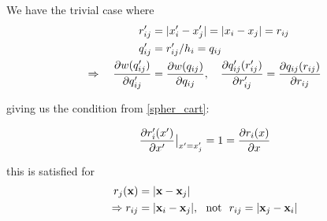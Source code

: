 We have the trivial case where
\begin{align*}
	r'_{ij} &= |x_i' - x_j'| = | x_i - x_j | = r_{ij} \\
	q'_{ij} &= r'_{ij}/h_i = q_{ij} \\
	\Rightarrow \quad \frac{\partial w(q'_{ij})}{\partial q'_{ij}} &= \frac{\partial w(q_{ij})}{\partial q_{ij}}, \quad \frac{\partial q'_{ij}(r'_{ij})}{\partial r'_{ij}} = \frac{\partial q_{ij}(r_{ij})}{\partial r_{ij}}
\end{align*}



giving us the condition from \ref{spher_cart}:






\begin{equation}
	\frac{\partial r'_{i}(x')}{\partial x'}	  \big{|}_{x' = x_j' } = 1 = \frac{\partial r_{i}(x)}{\partial x}
\end{equation}


this is satisfied for
\begin{align*}
	r_j(\mathbf{x}) &= | \mathbf{x} - \mathbf{x}_j | \\ 
	\Rightarrow r_{ij} &= | \mathbf{x}_i - \mathbf{x}_j |,\ \text{ not } \ r_{ij} = | \mathbf{x}_j - \mathbf{x}_i |
\end{align*}

















